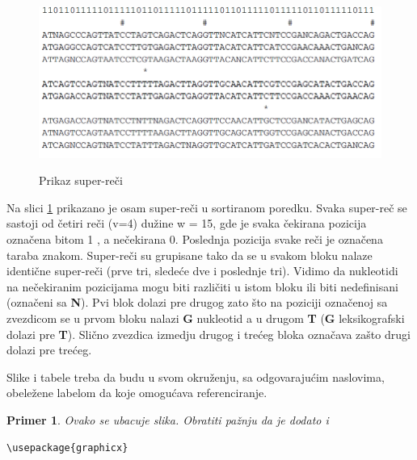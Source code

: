 \documentclass[a4paper]{article}
\newtheorem{primer}{Primer}[section]
\begin{document}
{\begin{figure}[h!]
\begin{center}
\end{center}
\includegraphics[width=\textwidth]{superreci}
\label{fig:superreci}
\caption{Prikaz super-reči}
\end{figure}

\indent Na slici \ref{fig:superreci} prikazano je osam super-reči u sortiranom poredku. Svaka super-reč se sastoji od četiri reči (v=4) dužine w = 15, gde je svaka čekirana pozicija označena bitom 1 , a nečekirana 0. Poslednja pozicija svake reči je označena taraba znakom. Super-reči su grupisane tako da se u svakom bloku nalaze identične super-reči (prve tri, sledeće dve i poslednje tri). Vidimo da nukleotidi na nečekiranim pozicijama mogu biti različiti u istom bloku ili biti nedefinisani (označeni sa \textbf{N}). Pvi blok dolazi pre drugog zato što na poziciji označenoj sa zvezdicom se u prvom bloku nalazi \textbf{G} nukleotid a u drugom \textbf{T} (\textbf{G} leksikografski dolazi pre \textbf{T}). Slično zvezdica izmedju drugog i trećeg bloka označava zašto drugi dolazi pre trećeg.

\iffalse
Slike i tabele treba da budu u svom okruženju, sa odgovarajućim naslovima, obeležene labelom da koje omogućava referenciranje. 

\begin{primer} Ovako se ubacuje slika. Obratiti pažnju da je dodato i 
\begin{verbatim}
\usepackage{graphicx}
\end{verbatim}


\end{primer}

}
\end{document}
